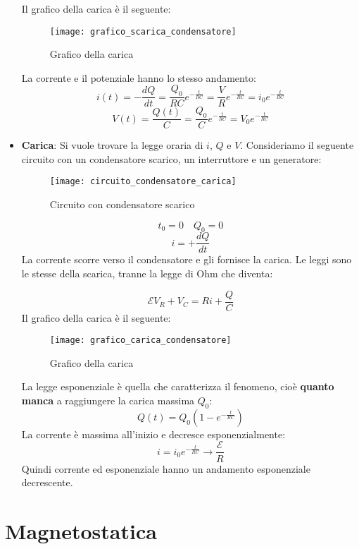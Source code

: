 \documentclass[a4paper]{article}
\begin{document}
\begin{itemize}
\begin{definition}
    Il grafico della carica è il seguente:
    \begin{figure}[H]
      \centering
      \texttt{[image: grafico\_scarica\_condensatore]}
      \caption{Grafico della carica}
    \end{figure}
    \noindent
    La corrente e il potenziale hanno lo stesso andamento:
    \[
      i(t) = -\frac{dQ}{dt} = \frac{Q_0}{RC} e^{-\frac{t}{RC}} = \frac{V}{R} e^{-\frac{t}{RC}} = i_0 e^{-\frac{t}{RC}}
    \] 
    \[
      V(t) = \frac{Q(t)}{C} = \frac{Q_0}{C} e^{-\frac{t}{RC}} = V_0 e^{-\frac{t}{RC}}
    \] 
    \end{definition}

  \item \textbf{Carica}: Si vuole trovare la legge oraria di \( i \), \( Q \) e \( V \).
    Consideriamo il seguente circuito con un condensatore scarico, un interruttore e
    un generatore:
    \begin{figure}[H]
      \centering
      \texttt{[image: circuito\_condensatore\_carica]}
      \caption{Circuito con condensatore scarico}
    \end{figure}
    \[
      t_0 = 0 \quad Q_0 = 0
    \] 
    \[
      i = + \frac{dQ}{dt}
    \] 
    La corrente scorre verso il condensatore e gli fornisce la carica. Le leggi sono le
    stesse della scarica, tranne la legge di Ohm che diventa:
    \begin{definition}
      \[
        \mathcal{E} V_R + V_C = Ri + \frac{Q}{C}
      \] 
      Il grafico della carica è il seguente:
      \begin{figure}[H]
        \centering
        \texttt{[image: grafico\_carica\_condensatore]}
        \caption{Grafico della carica}
      \end{figure}
      \noindent
      La legge esponenziale è quella che caratterizza il fenomeno, cioè \textbf{quanto
      manca} a raggiungere la carica massima \( Q_0 \):
      \[
        Q(t) = Q_0 \left( 1 - e^{-\frac{t}{RC}} \right)
      \]
      La corrente è massima all'inizio e decresce esponenzialmente:
      \[
        i = i_0 e^{-\frac{t}{RC}} \to \frac{\mathcal{E}}{R}
      \] 
      Quindi corrente ed esponenziale hanno un andamento esponenziale decrescente.
    \end{definition}
\end{itemize}

\section{Magnetostatica}
\end{document}
